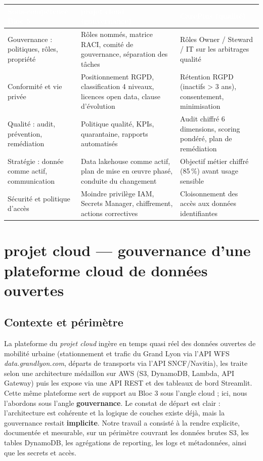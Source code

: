 \documentclass[11pt]{article}
\newcommand{\thead}[1]{\textbf{\textcolor{white}{#1}}}
\begin{document}
\begin{center}
\begin{tabularx}{\linewidth}{@{}>{\raggedright\arraybackslash}p{3.4cm}>{\raggedright\arraybackslash}X>{\raggedright\arraybackslash}X@{}}
\toprule
\rowcolor{tableHeader}
\thead{Sous-compétence Bloc 5} & \thead{projet cloud (gouvernance)} & \thead{CarePlus (qualité)} \\
\midrule
Gouvernance : politiques, rôles, propriété &
  Rôles nommés, matrice RACI, comité de gouvernance, séparation des tâches &
  Rôles Owner / Steward / IT sur les arbitrages qualité \\
Conformité et vie privée &
  Positionnement RGPD, classification 4 niveaux, licences open data, clause d'évolution &
  Rétention RGPD (inactifs > 3 ans), consentement, minimisation \\
Qualité : audit, prévention, remédiation &
  Politique qualité, KPIs, quarantaine, rapports automatisés &
  Audit chiffré 6 dimensions, scoring pondéré, plan de remédiation \\
Stratégie : donnée comme actif, communication &
  Data lakehouse comme actif, plan de mise en œuvre phasé, conduite du changement &
  Objectif métier chiffré (85\,\%) avant usage sensible \\
Sécurité et politique d'accès &
  Moindre privilège IAM, Secrets Manager, chiffrement, actions correctives &
  Cloisonnement des accès aux données identifiantes \\
\bottomrule
\end{tabularx}
\end{center}

\newpage
\section{projet cloud --- gouvernance d'une plateforme cloud de données ouvertes}

\subsection{Contexte et périmètre}

La plateforme du \textit{projet cloud} ingère en temps quasi réel des données
ouvertes de mobilité urbaine (stationnement et trafic du Grand Lyon via l'API WFS
\textit{data.grandlyon.com}, départs de transports via l'API SNCF/Navitia), les
traite selon une architecture médaillon sur AWS (S3, DynamoDB, Lambda, API Gateway)
puis les expose via une API REST et des tableaux de bord Streamlit. Cette même
plateforme sert de support au Bloc 3 sous l'angle cloud ; ici, nous l'abordons sous
l'angle \textbf{gouvernance}. Le constat de départ est clair : l'architecture est
cohérente et la logique de couches existe déjà, mais la gouvernance restait
\textbf{implicite}. Notre travail a consisté à la rendre explicite, documentée et
mesurable, sur un périmètre couvrant les données brutes S3, les tables DynamoDB, les
agrégations de reporting, les logs et métadonnées, ainsi que les secrets et accès.
\end{document}

